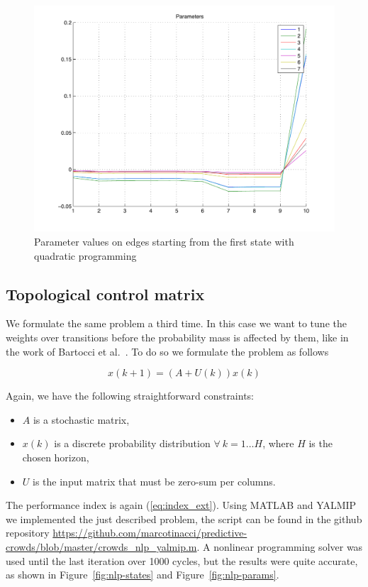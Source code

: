 \documentclass[a4paper, 11pt]{article}
\theoremstyle{definition}
\theoremstyle{remark}
\begin{document}
\begin{figure}[htbp!]
	\begin{center}
	\includegraphics[width=.8\textwidth]{images/qp-params}
	\end{center}
	\caption{Parameter values on edges starting from the first state with quadratic programming}
	\label{fig:qp-params}
\end{figure}

\subsection{Topological control matrix} %
\label{sub:topological_control_matrix}

We formulate the same problem a third time. In this case we want to tune the weights over transitions before the probability mass is affected by them, like in the work of Bartocci et al.~\cite{DBLP:conf/tacas/2011}. To do so we formulate the problem as follows

\begin{equation}\label{eq:top-system}
	x(k+1) = (A+U(k)) x(k)
\end{equation}

Again, we have the following straightforward constraints:
\begin{itemize}
	\item $A$ is a stochastic matrix,
	\item $x(k)$ is a discrete probability distribution $\forall\ k=1\dots H$, where $H$ is the chosen horizon,
	\item $U$ is the input matrix that must be zero-sum per columns.
\end{itemize}

The performance index is again (\ref{eq:index_ext}). Using MATLAB and YALMIP we implemented the just described problem, the script can be found in the github repository  \url{https://github.com/marcotinacci/predictive-crowds/blob/master/crowds_nlp_yalmip.m}. A nonlinear programming solver was used until the last iteration over 1000 cycles, but the results were quite accurate, as shown in Figure~\ref{fig:nlp-states} and Figure~\ref{fig:nlp-params}.
\end{document}
